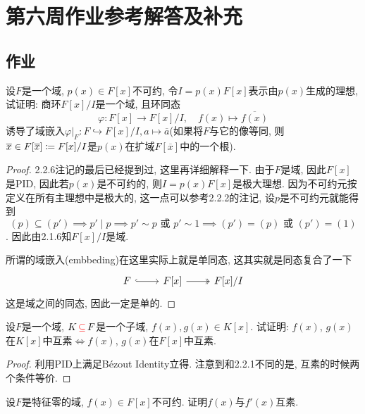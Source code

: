 \documentclass{../solutions-cn}
\begin{document}
\section*{第六周作业参考解答及补充}

\subsection*{作业}

\begin{exercise}[习题2.3.2]
    设$F$是一个域, $p(x) \in F[x]$不可约, 令$I = p(x)F[x]$表示由$p(x)$生成的理想, 试证明: 商环$F[x]/I$是一个域, 且环同态
    \[
        \varphi:F[x] \to F[x]/I,\quad f(x) \mapsto \overline{f(x)}
    \]
    诱导了域嵌入$\varphi|_F: F \hookrightarrow F[x]/I, a \mapsto \overline{a}$(如果将$F$与它的像等同, 则$\overline{x} \in F[\overline{x}] \mathrel{\coloneqq} F[x]/I$是$p(x)$在扩域$F[\overline{x}]$中的一个根).
\end{exercise}

\begin{proof}
    2.2.6注记的最后已经提到过, 这里再详细解释一下. 由于$F$是域, 因此$F[x]$是PID, 因此若$p(x)$是不可约的, 则$I = p(x)F[x]$是极大理想. 因为不可约元按定义在所有主理想中是极大的, 这一点可以参考2.2.2的注记, 设$p$是不可约元就能得到
    \[
        (p) \subseteq (p') \implies p' \mid p \implies p' \sim p \text{ 或 } p' \sim 1 \implies (p') = (p) \text{ 或 } (p') = (1)
    \]. 因此由2.1.6知$F[x]/I$是域.
    
    所谓的域嵌入(embbeding)在这里实际上就是单同态, 这其实就是同态复合了一下
    \[
        \begin{tikzcd}
            F \arrow[r, hook] & {F[x]} \arrow[r, two heads] & {F[x]/I}
        \end{tikzcd}
    \]
    这是域之间的同态, 因此一定是单的.
\end{proof}

\begin{exercise}[习题2.3.3]
    设$F$是一个域, $K \,\textcolor{red}{\subseteq}\, F$是一个子域, $f(x), g(x) \in K[x]$. 试证明: $f(x)$, $g(x)$在$K[x]$中互素$\Leftrightarrow f(x)$, $g(x)$在$F[x]$中互素.
\end{exercise}

\begin{proof}
    利用PID上满足Bézout Identity立得. 注意到和2.2.1不同的是, 互素的时候两个条件等价.
\end{proof}

\begin{exercise}[习题2.3.4]
    设$F$是特征零的域, $f(x) \in F[x]$不可约. 证明$f(x)$与$f'(x)$互素.
\end{exercise}
\end{document}
